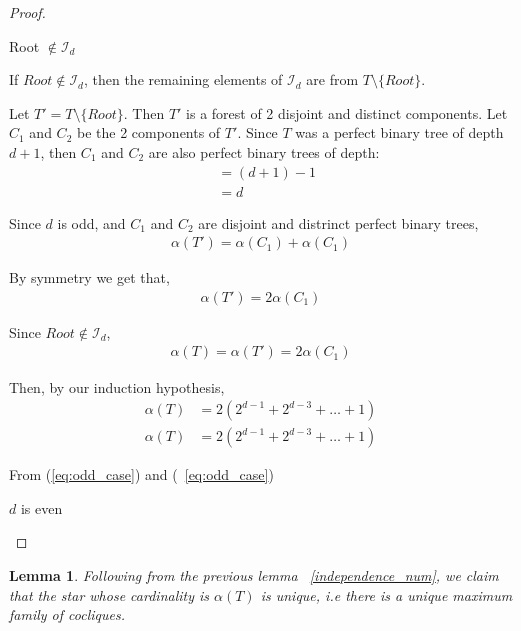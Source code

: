 \documentclass{article}
\newtheorem{lemma}[theorem]{Lemma}
\theoremstyle{definition}
\begin{document}
\begin{proof}
\begin{caseof}
\begin{subcaseof}
			\item Root $\not\in \mathcal{I}_d$

			If $Root \not\in \mathcal{I}_d$, then the remaining elements of $\mathcal{I}_d$ are from $T \setminus \{Root\}$.

			Let $T' = T\setminus\{Root\}$. Then $T'$ is a forest of 2 disjoint and distinct components. Let $C_1$ and $C_2$ be the 2 components of $T'$. Since $T$ was a perfect binary tree of depth $d + 1$, then $C_1$ and $C_2$ are also perfect binary trees of depth:
			\begin{align*}
				 & = (d + 1) - 1 \\
				 & = d
			\end{align*}

			Since $d$ is odd, and $C_1$ and $C_2$ are disjoint and distrinct perfect binary trees,
			\begin{align*}
				\alpha(T') = \alpha(C_1) + \alpha(C_1)
			\end{align*}

			By symmetry we get that,
			\begin{align*}
				\alpha(T') = 2\alpha(C_1)
			\end{align*}

			Since $Root \not\in \mathcal{I}_d$,
			\begin{align*}
				\alpha(T) = \alpha(T') = 2\alpha(C_1)
			\end{align*}

			Then, by our induction hypothesis,
			\begin{align*}
				\alpha(T) & = 2(2^{d - 1} + 2^{d - 3} + \dots + 1) \\
				\alpha(T) & = 2(2^{d - 1} + 2^{d - 3} + \dots + 1)
			\end{align*}
		\end{subcaseof}

		From (\ref{eq:odd_case}) and (~\cref{eq:odd_case})

		\item $d$ is even
	\end{caseof}
\end{proof}

\begin{lemma}
	Following from the previous lemma ~\cref{independence_num}, we claim that the star whose cardinality is $\alpha(T)$ is unique, i.e there is a unique maximum family of cocliques.
\end{lemma}
\end{document}
